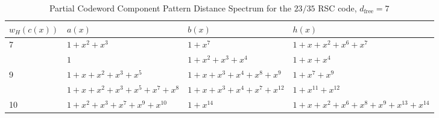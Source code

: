 \begin{example}
\end{example}

\begin{example}
\begin{table}[htbp]
	\caption{Partial Codeword Component Pattern Distance Spectrum for the $23/35$ RSC code, $d_{\text{free}}=7$}
	\centering
	\begin{tabularx}{0.75\textwidth}{lXlX} 
		\hline
		$w_H(c(x))$ & $a(x)$ & $b(x)$ & $h(x)$ \\ [0.5ex] 
		\hline\hline
		7&$1+x^2+x^3$ & $1+x^7$ & $1+x+x^2+x^6+x^7$\\
		\hline
		&$1$ & $1+x^2+x^3+x^4$ & $1+x+x^{4}$\\
		\hline \hline
		9&$1+x+x^2+x^3+x^5$ & $1+x+x^3+x^4+x^8+x^9$ & $1+x^7+x^9$\\
		\hline
		&$1+x+x^2+x^3+x^5+x^7+x^8$ & $1+x+x^3+x^4+x^7+x^{12}$ & $1+x^{11}+x^{12}$\\
		\hline\hline
		10&$1+x^2+x^3+x^7+x^9+x^{10}$ & $1+x^{14}$ & $1+x+x^2+x^6+x^8+x^9+x^{13}+x^{14}$\\
		\hline
	\end{tabularx}
	
	\label{novelTab15}
\end{table}


\end{example}
